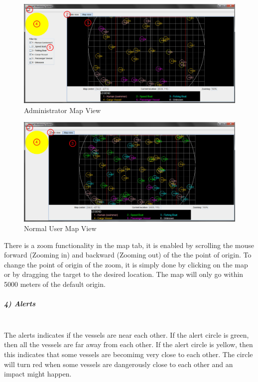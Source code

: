 \documentclass{article}
\begin{document}
	\begin{figure}[!htb]
	\caption{Administrator Map View}
	\centering
	\includegraphics[scale=0.36]{images/userManual3_admin.jpg}
	\end{figure}

	\begin{figure}[!htb]
	\caption{Normal User Map View}
	\centering
	\includegraphics[scale=0.36]{images/userManual3_user.jpg}
	\end{figure}

There is a zoom functionality in the map tab, it is enabled by scrolling the mouse forward (Zooming in) and backward (Zooming out) of the the point of origin. To change the point of origin of the zoom, it is simply done by clicking on the map or by dragging the target to the desired location. The map will only go within 5000 meters of the default origin.

\pagebreak
\subparagraph{4) Alerts \\ \\}
The alerts indicates if the vessels are near each other. If the alert circle is green, then all the vessels are far away from each other. If the alert circle is yellow, then this indicates that some vessels are becomimg very close to each other. The circle will turn red when some vessels are dangerously close to each other and an impact might happen.\\
\end{document}

